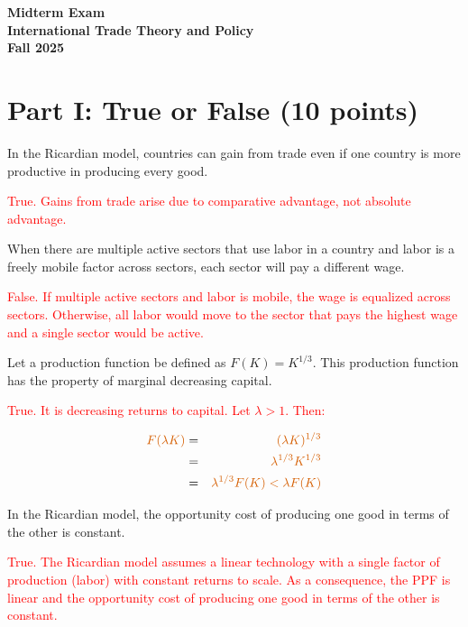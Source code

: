 \documentclass[11pt,letterpaper]{exam}
\newcommand{\red}[1]{\textcolor{red}{#1}}
\begin{document}
\begin{center}

{\large

\textbf{Midterm Exam\\International Trade Theory and Policy\\Fall 2025}

}
\end{center}

\section*{Part I: True or False (10 points)}

\begin{questions}
\question In the Ricardian model, countries can gain from trade even if one country is more productive in producing every good.

\red{True. Gains from trade arise due to comparative advantage, not absolute advantage.}

\question When there are multiple active sectors that use labor in a country and labor is a freely mobile factor across sectors, each sector will pay a different wage.

\red{False. If multiple active sectors and labor is mobile, the wage is equalized across sectors. Otherwise, all labor would move to the sector that pays the highest wage and a single sector would be active.}

\question Let a production function be defined as $F(K) = K^{1/3}$. This production function has the property of marginal decreasing capital.

\textcolor{red}{True. It is decreasing returns to capital. Let $\lambda > 1$. Then:}

\begin{eqnarray*}
    \textcolor{red}{
        F(\lambda K)} &=& \textcolor{red}{(\lambda K)^{1/3}} \\
        &=& \textcolor{red}{\lambda^{1/3} K^{1/3}} \\
        &=& \textcolor{red}{\lambda^{1/3} F(K) < \lambda F(K)
    }
\end{eqnarray*}

\question In the Ricardian model, the opportunity cost of producing one good in terms of the other is constant.

\red{True. The Ricardian model assumes a linear technology with a single factor of production (labor) with constant returns to scale.  As a consequence, the PPF is linear and the opportunity cost of producing one good in terms of the other is  constant.}


\end{questions}
\end{document}
